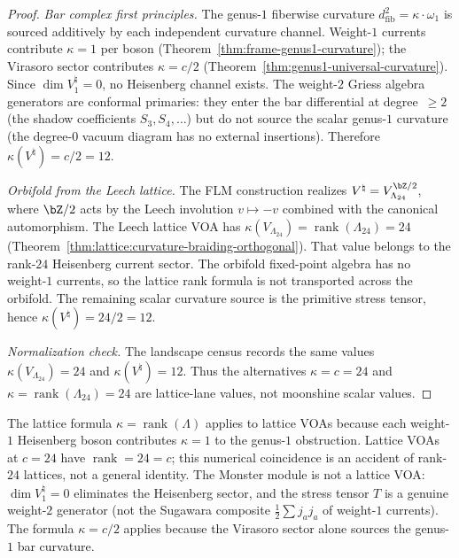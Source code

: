 \begin{proof}
\emph{Bar complex first principles.}
The genus-$1$ fiberwise curvature
$d_{\mathrm{fib}}^2 = \kappa \cdot \omega_1$ is sourced
additively by each independent curvature channel.
Weight-$1$ currents contribute $\kappa = 1$ per boson
(Theorem~\ref{thm:frame-genus1-curvature}); the Virasoro
sector contributes $\kappa = c/2$
(Theorem~\ref{thm:genus1-universal-curvature}).
Since $\dim V_1^\natural = 0$, no Heisenberg channel exists.
The weight-$2$ Griess algebra generators are conformal
primaries: they enter the bar differential at degree~$\geq 2$
(the shadow coefficients $S_3, S_4, \ldots$) but do not
source the scalar genus-$1$ curvature (the degree-$0$ vacuum
diagram has no external insertions). Therefore
$\kappa(V^\natural) = c/2 = 12$.

\emph{Orbifold from the Leech lattice.}
The FLM construction realizes $V^\natural = V_{\Lambda_{24}}^{\bZ/2}$,
where $\bZ/2$ acts by the Leech involution $v \mapsto -v$ combined
with the canonical automorphism. The Leech lattice VOA has
$\kappa(V_{\Lambda_{24}}) = \operatorname{rank}(\Lambda_{24}) = 24$
(Theorem~\ref{thm:lattice:curvature-braiding-orthogonal}).
That value belongs to the rank-$24$ Heisenberg current sector. The
orbifold fixed-point algebra has no weight-$1$ currents, so the
lattice rank formula is not transported across the orbifold. The
remaining scalar curvature source is the primitive stress tensor,
hence $\kappa(V^\natural)=24/2=12$.

\emph{Normalization check.}
The landscape census records the same values
$\kappa(V_{\Lambda_{24}})=24$ and $\kappa(V^\natural)=12$. Thus the alternatives $\kappa=c=24$ and
$\kappa=\operatorname{rank}(\Lambda_{24})=24$ are lattice-lane
values, not moonshine scalar values.
\end{proof}

\begin{remark}[Why $\kappa = c/2$, not $\kappa = 24$]%
\label{rem:moonshine-kappa-not-24}%
%
The lattice formula $\kappa = \operatorname{rank}(\Lambda)$ applies
to lattice VOAs because each weight-$1$ Heisenberg boson
contributes $\kappa = 1$ to the genus-$1$ obstruction. Lattice
VOAs at $c = 24$ have $\operatorname{rank} = 24 = c$; this
numerical coincidence is an accident of rank-$24$ lattices, not a
general identity. The Monster module is not a lattice VOA:
$\dim V_1^\natural = 0$ eliminates the Heisenberg sector, and the
stress tensor $T$ is a genuine weight-$2$ generator (not the
Sugawara composite $\tfrac{1}{2}\sum j_a j_a$ of weight-$1$
currents). The formula $\kappa = c/2$ applies because the
Virasoro sector alone sources the genus-$1$ bar curvature.
\end{remark}

